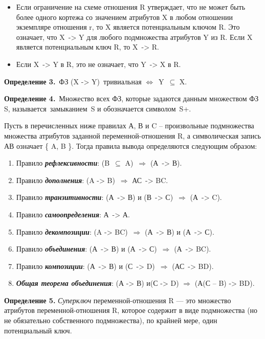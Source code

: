 \begin{itemize}[label*=--]
	\item Если ограничение на схеме отношения R утверждает, что не может быть более одного кортежа со значением атрибутов X в любом отношении экземпляре отношения r, то X является потенциальным ключом R. 
	Это означает, что X -> Y для любого подмножества атрибутов Y из R. 
	Если X является потенциальным ключ R, то X -> R.
	\item Если X -> Y в R, это не означает, что Y -> X в R.
\end{itemize}

\textbf{Определение 3.} ФЗ (X -> Y) тривиальная $\Leftrightarrow$ Y $\subseteq$ X.

\textbf{Определение 4.} Множество всех ФЗ, которые задаются данным множеством ФЗ S, называется замыканием S и обозначается символом S+.

Пусть в перечисленных ниже правилах А, В и C – произвольные подмножества множества атрибутов заданной переменной-отношения R, а символическая запись АВ означает \{ A, B \}. 
Тогда правила вывода определяются следующим образом:

\begin{enumerate}[label={\arabic*)}]
	\item  Правило \textit{\bfseries рефлексивности}: (B $\subseteq$ A) $\Rightarrow$ (А -> В).
	\item  Правило \textit{\bfseries дополнения}: (A -> B) $\Rightarrow$ АС -> BC.
	\item  Правило \textit{\bfseries транзитивности}: (А -> В) и (В -> С) $\Rightarrow$ (А -> C).
	\item  Правило \textit{\bfseries самоопределения}: А -> А.
	\item  Правило \textit{\bfseries декомпозиции}: (A -> BC) $\Rightarrow$ (А -> В) и (А -> С).
	\item  Правило \textit{\bfseries объединения}: (А -> В) и (А -> С) $\Rightarrow$ (А -> BC). 
	
\clearpage

	\item  Правило \textit{\bfseries композиции}: (А -> В) и (С -> D) $\Rightarrow$ (АС -> BD).
	\item  \textit{\bfseries Общая теорема объединения}: (А -> В) и(С -> D) $\Rightarrow$ (А(С – B) -> BD).
\end{enumerate}


\textbf{Определение 5.} \textit{Суперключ} переменной-отношения R --- это множество атрибутов переменной-отношения R, которое содержит в виде подмножества (но не обязательно собственного подмножества), по крайней мере, один потенциальный ключ.

